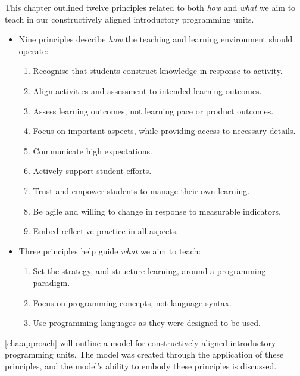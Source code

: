 This chapter outlined twelve principles related to both \emph{how} and \emph{what} we aim to teach in our constructively aligned introductory programming units.
\begin{itemize}[noitemsep,nolistsep]
	\item Nine principles describe \emph{how} the teaching and learning environment should operate:
	\begin{enumerate}
		\item \label{itm:construct} Recognise that students construct knowledge in response to activity.
		\item \label{itm:align} Align activities and assessment to intended learning outcomes.
		\item \label{itm:formative} Assess learning outcomes, not learning pace or product outcomes.
		\item \label{itm:focus} Focus on important aspects, while providing access to necessary details.
		\item \label{itm:expectations} Communicate high expectations.
		\item \label{itm:support} Actively support student efforts.
		\item \label{itm:theory_y} Trust and empower students to manage their own learning.
		\item \label{itm:agile} Be agile and willing to change in response to measurable indicators.
		\item \label{itm:reflect} Embed reflective practice in all aspects.
	\end{enumerate}
	\item Three principles help guide \emph{what} we aim to teach:
	\begin{enumerate}[start=10,noitemsep,nolistsep]
		\item \label{itm:paradigm} Set the strategy, and structure learning, around a programming paradigm.
		\item \label{itm:concepts} Focus on programming concepts, not language syntax.
		\item \label{itm:authentic} Use programming languages as they were designed to be used.
	\end{enumerate}
\end{itemize}

\cref{cha:approach} will outline a model for constructively aligned introductory programming units. The model was created through the application of these principles, and the model's ability to embody these principles is discussed.


